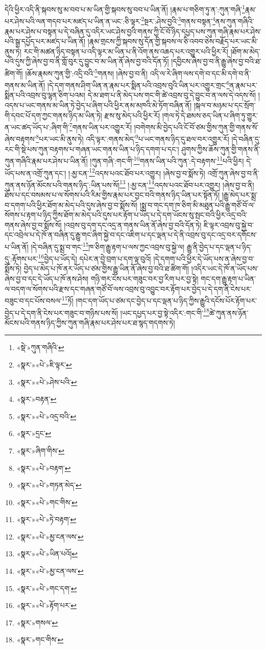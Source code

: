 དེའི་ཕྱིར་འདི་ནི་སྐབས་སུ་མ་བབ་པ་མ་ཡིན་གྱི་སྐབས་སུ་བབ་པ་ཡིན་ནོ། །རྣམ་པ་གཅིག་ཏུ་ན་:ཀུན་གཞི་\footnote{«སྡེ་»ཀུན་གཞིའི་}རྣམ་པར་ཤེས་པའི་ལན་གདབ་པར་མཛད་པ་ཡིན་ན་ཡང་:ཅི་ལྟར་\footnote{«སྣར་»«པེ་»ཇི་ལྟར་}སྔར་:ཤེས་བྱའི་\footnote{«སྣར་»«པེ་»ཤེས་པའི་}གནས་བསྟན་\footnote{«སྣར་»བརྟན་}ནས་ཀུན་གཞིའི་རྣམ་པར་ཤེས་པ་བསྟན་པ་དེ་བཞིན་དུ་འདིར་ཡང་ཤེས་བྱའི་གནས་ཀྱི་ངོ་བོ་ཉིད་དཔྱད་པས་ཀུན་གཞི་རྣམ་པར་ཤེས་པའི་སྒྲ་དཔྱོད་པར་མཛད་པ་ཡིན་ནོ། །རྣམ་གྲངས་ཀྱི་སྐབས་སུ་དོན་གྱི་སྐབས་ལ་ཅི་འབབ་ཅེས་བརྗོད་པར་ཡང་མི་ནུས་ཏེ། རང་གི་མཚན་ཉིད་བསྟན་པ་འདི་ལྟར་མ་ཡིན་པ་ནི་འོག་ནས་འཆད་པར་འགྱུར་པའི་ཕྱིར་རོ། །ཐོག་མ་མེད་པའི་དུས་ཀྱི་ཞེས་བྱ་བ་ནི་གློ་བུར་དུ་བྱུང་བ་མ་ཡིན་ནོ་ཞེས་བྱ་བའི་དོན་ཏོ། །དབྱིངས་ཞེས་བྱ་བ་ནི་རྒྱུ་ཞེས་བྱ་བའི་ཐ་ཚིག་གོ། །ཆོས་རྣམས་ཀུན་གྱི་:འདྲི་བའི་\footnote{«སྣར་»«པེ་»འདྲ་བའི་}གནས། །ཞེས་བྱ་བ་ནི། འདི་ལ་རེ་ཞིག་ལས་དགེ་བ་དང་མི་དགེ་བ་ནི་གནས་མ་ཡིན་ནོ། །དེ་དག་གནས་ཤིག་ཡིན་ན་རྣམ་པར་སྨིན་པའི་འབྲས་བུའི་ཡིན་པར་འགྱུར་གྲང་\footnote{«སྣར་»དྲང་}ན་རྣམ་པར་སྨིན་པའི་འབྲས་བུ་ལྷན་ཅིག་པའམ། དེ་མ་ཐག་པ་ནི་མེད་པས་གང་གི་ཚེ་འབྲས་བུ་དེ་བྱུང་བ་ན་ལས་དེ་འདས་སོ། །འདས་པ་ཡང་གནས་མ་ཡིན་ཏེ་བྱེད་པ་ཞིག་པའི་ཕྱིར་ནམ་མཁའི་མེ་ཏོག་བཞིན་ནོ། །སྐལ་བ་མཉམ་པ་དང་སྲོག་གི་དབང་པོ་དག་ཀྱང་གནས་ཉིད་མ་ཡིན་ཏེ། རྫས་སུ་མེད་པའི་ཕྱིར་རོ། །གལ་ཏེ་དེ་ཐམས་ཅད་ཡིན་པ་ཞིག་ཏུ་གྱུར་ན་ཡང་ཚད་ཡོད་པ་:ཞིག་གི་\footnote{«སྣར་»ཞིག་གིས་}གནས་ཡིན་པར་འགྱུར་རོ། །བགེགས་མི་བྱེད་པའི་ངོ་བོ་ཙམ་གྱིས་ཀུན་གྱི་གནས་སོ་ཞེས་བརྟགས་\footnote{«སྣར་»«པེ་»བརྟག་}པར་ཡང་མི་ནུས་ཏེ། འདི་ལྟར་:གནས་མེད་\footnote{«སྣར་»«པེ་»གཏན་མེད་}པ་ཡང་གནས་ཉིད་དུ་ཐལ་བར་འགྱུར་རོ། །དེ་བཞིན་དུ་རང་གི་སྡེ་པས་ཀུན་བརྟགས་པ་གཞན་ཡང་གནས་ཡིན་པ་ཉིད་དགག་པ་དང་། ཤུགས་ཀྱིས་ཆོས་ཀུན་གྱི་གནས་ནི་ཀུན་གཞིའི་རྣམ་པར་ཤེས་པ་ཡིན་ནོ། །ཀུན་གཞི་:གང་གི་\footnote{«སྣར་»«པེ་»གང་གིས་}གནས་ཡིན་པའི་ཀུན་:དེ་བརྟགས་\footnote{«སྣར་»«པེ་»ཏེ་བརྟག་}པའི་ཕྱིར། དེ་ཡོད་པས་ན་འགྲོ་ཀུན་དང་། །:མྱ་ངན་\footnote{«སྣར་»«པེ་»མྱ་ངན་ལས་}འདས་པའང་ཐོབ་པར་འགྱུར། །ཞེས་བྱ་བ་སྨོས་ཏེ། འགྲོ་ཀུན་ཞེས་བྱ་བ་ནི་ཀུན་ནས་ཉོན་མོངས་པའི་གནས་ཉིད་:ཡིན་པས་སོ།\footnote{«སྣར་»«པེ་»ཡིན་པའོ།} །:མྱ་ངན་\footnote{«སྣར་»«པེ་»མྱ་ངན་ལས་}འདས་པའང་ཐོབ་པར་འགྱུར། །ཞེས་བྱ་བ་ནི། ཐོས་པ་དང་བསམས་པ་ལ་སོགས་པའི་རིམ་གྱིས་རྣམ་པར་བྱང་བའི་གནས་ཉིད་ཡིན་པར་སྟོན་ཏོ། །རྒྱུ་མེད་པར་སྨྲ་བ་དགག་པའི་ཕྱིར་ཐོག་མ་མེད་པའི་དུས་ཞེས་བྱ་བ་སྨོས་སོ། །སྨྲ་བ་གང་དག་ཁ་ཅིག་མི་མཐུན་པའི་རྒྱུ་གཙོ་བོ་ལ་སོགས་པ་རྟག་པ་ཉིད་ཀྱིས་ཐོག་མ་མེད་པའི་དུས་པར་རྟོག་པ་ཡོད་པ་དེ་དག་ཡོངས་སུ་སྤང་བའི་ཕྱིར་འདྲ་བའི་གནས་ཞེས་བྱ་བ་སྨོས་སོ། །འབྲས་བུ་དག་དང་འདྲ་ན་གནས་ཡིན་ནོ་ཞེས་བྱ་བའི་དོན་ཏེ། ཇི་ལྟར་འབྲས་བུ་སྐྱེ་བ་དང་འབྲེལ་པ་དེ་ཁོ་ན་བཞིན་དུ་རྒྱུ་གང་ཞིག་སྐྱེ་བ་དང་འཇིག་པ་དང་ལྡན་པ་དེ་ནི་འབྲས་བུ་དང་འདྲ་བར་དགོངས་པ་ཡིན་ནོ། །དེ་བཞིན་དུ་སྨྲ་བ་གང་\footnote{«སྣར་»«པེ་»གང་དག་}ཁ་ཅིག་རྒྱུ་རྟག་པ་ལས་ཀྱང་འབྲས་བུ་སྐྱེ་ལ། རྒྱུ་ནི་བྱེད་པ་དང་ལྡན་པ་ཉིད་དུ་:རྟོགས་པར་\footnote{«སྣར་»«པེ་»རྟོག་པར་}བྱེད་པ་ཡོད་དེ། དཔེར་ན་བྱེ་བྲག་པ་དག་ལྟ་བུའོ། །དེ་དགག་པའི་ཕྱིར་དེ་ཡོད་པས་ན་ཞེས་བྱ་བ་སྨོས་ཏེ། བྱེད་པ་མེད་པ་ཁོ་ནར་ཡོད་པ་ཙམ་གྱིས་རྒྱུ་ཡིན་ནོ་ཞེས་བྱ་བའི་ཐ་ཚིག་གོ། །འདིར་ཡང་དེ་ཁོ་ན་ཡོད་པས་ཞེས་བྱ་བ་དང་དེ་ཡོད་པ་ཁོ་ནས་ཤེས། གཉི་གར་ངེས་པར་གཟུང་བར་བྱ་རིག་པར་བྱ་སྟེ། གང་དག་རྒྱུ་རྟག་པ་ཡིན་ལ་བདག་ལ་སོགས་པའི་རྫས་དང་གཞན་གཙོ་བོ་ལས་འབྲས་བུ་འབྱུང་བར་རྟོག་པར་བྱེད་པ་དེ་དག་ནི་ངེས་པར་བཟུང་བ་དང་པོས་བསལ་\footnote{«སྣར་»གསལ་}ཏོ། །གང་དག་ཡོད་པ་ཙམ་དང་བྱེད་པ་དང་ལྡན་པ་ཉིད་ཀྱིས་རྒྱུའི་དངོས་པོར་རྟོག་པར་བྱེད་པ་དེ་དག་ནི་ངེས་པར་གཟུང་བ་གཉིས་པས་སོ། །ཡང་དཔྱད་པར་བྱ་སྟེ་འདིར་:གང་གི་\footnote{«སྣར་»གང་གིས་}ཚེ་ཀུན་ནས་ཉོན་མོངས་པའི་གནས་ཉིད་ཀྱིས་ཀུན་གཞི་རྣམ་པར་ཤེས་པར་ཐ་སྙད་གདགས་ཏེ། 